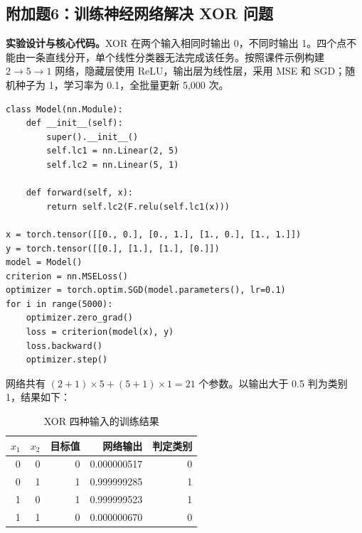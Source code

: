 \documentclass[UTF8,11pt,a4paper,fontset=fandol]{ctexart}
\newcommand{\question}[1]{\Needspace{14\baselineskip}\subsection{#1}}
\begin{document}
\clearpage
\question{附加题6：训练神经网络解决 XOR 问题}
\textbf{实验设计与核心代码。}XOR 在两个输入相同时输出 0，不同时输出 1。四个点不能由一条直线分开，单个线性分类器无法完成该任务。按照课件示例构建 $2\to5\to1$ 网络，隐藏层使用 ReLU，输出层为线性层，采用 MSE 和 SGD；随机种子为 1，学习率为 0.1，全批量更新 5,000 次。
\par\noindent\begin{minipage}{\linewidth}
\begin{lstlisting}
class Model(nn.Module):
    def __init__(self):
        super().__init__()
        self.lc1 = nn.Linear(2, 5)
        self.lc2 = nn.Linear(5, 1)

    def forward(self, x):
        return self.lc2(F.relu(self.lc1(x)))

x = torch.tensor([[0., 0.], [0., 1.], [1., 0.], [1., 1.]])
y = torch.tensor([[0.], [1.], [1.], [0.]])
model = Model()
criterion = nn.MSELoss()
optimizer = torch.optim.SGD(model.parameters(), lr=0.1)
for i in range(5000):
    optimizer.zero_grad()
    loss = criterion(model(x), y)
    loss.backward()
    optimizer.step()
\end{lstlisting}
\end{minipage}\par
网络共有 $(2+1)\times5+(5+1)\times1=21$ 个参数。以输出大于 0.5 判为类别 1，结果如下：
\begin{table}[H]\centering\small
\caption{XOR 四种输入的训练结果}
\begin{tabular}{rrrrr}\toprule
$x_1$ & $x_2$ & 目标值 & 网络输出 & 判定类别 \\\midrule
0 & 0 & 0 & 0.000000517 & 0 \\
0 & 1 & 1 & 0.999999285 & 1 \\
1 & 0 & 1 & 0.999999523 & 1 \\
1 & 1 & 0 & 0.000000670 & 0 \\

\bottomrule\end{tabular}
\end{table}
\end{document}
